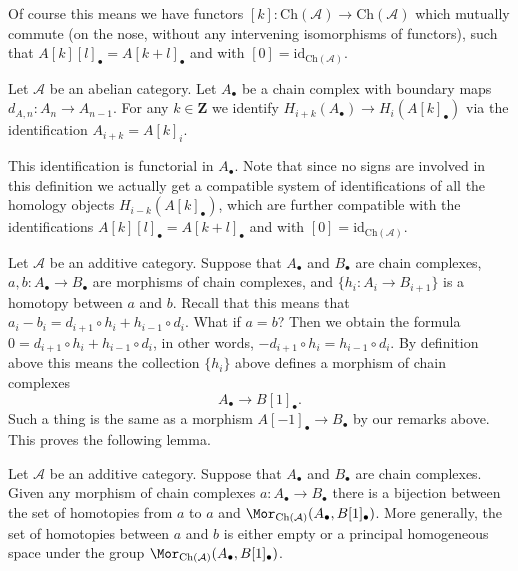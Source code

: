 \noindent
Of course this means we have functors
$[k] : \text{Ch}(\mathcal{A}) \to \text{Ch}(\mathcal{A})$
which mutually commute (on the nose, without
any intervening isomorphisms of functors),
such that $A[k][l]_\bullet = A[k + l]_\bullet$ and
with $[0] = \text{id}_{\text{Ch}(\mathcal{A})}$.

\begin{definition}
\label{definition-homology-shift}
Let $\mathcal{A}$ be an abelian category.
Let $A_\bullet$ be a chain complex
with boundary maps $d_{A, n} : A_n \to A_{n - 1}$.
For any $k \in \mathbf{Z}$ we identify
{\it $H_{i + k}(A_\bullet) \rightarrow H_i(A[k]_\bullet)$}
via the identification
$A_{i + k} = A[k]_i$.
\end{definition}

\noindent
This identification is functorial in $A_\bullet$.
Note that since no signs are involved in this
definition we actually get a compatible system
of identifications of all the homology
objects $H_{i - k}(A[k]_\bullet)$, which are
further compatible with the identifications
$A[k][l]_\bullet = A[k + l]_\bullet$ and
with $[0] = \text{id}_{\text{Ch}(\mathcal{A})}$.

\medskip\noindent
Let $\mathcal{A}$ be an additive category.
Suppose that $A_\bullet$ and $B_\bullet$ are
chain complexes, $a, b : A_\bullet \to B_\bullet$ are
morphisms of chain complexes, and $\{h_i : A_i \to B_{i + 1}\}$
is a homotopy between $a$ and $b$. Recall that this means
that
$a_i - b_i = d_{i + 1} \circ h_i + h_{i - 1} \circ d_i$.
What if $a = b$? Then we obtain the formula
$0 = d_{i + 1} \circ h_i + h_{i - 1} \circ d_i$,
in other words, $ - d_{i + 1} \circ h_i = h_{i - 1} \circ d_i$.
By definition above this means the collection $\{h_i\}$
above defines a morphism of chain complexes
$$
A_\bullet \longrightarrow B[1]_\bullet.
$$
Such a thing is the same as a morphism $A[-1]_\bullet \to B_\bullet$
by our remarks above. This proves the following lemma.

\begin{lemma}
\label{lemma-homotopy-shift}
Let $\mathcal{A}$ be an additive category.
Suppose that $A_\bullet$ and $B_\bullet$ are
chain complexes. Given any morphism of chain
complexes $a : A_\bullet \to B_\bullet$ there
is a bijection between the set of homotopies
from $a$ to $a$ and
$\Mor_{\text{Ch}(\mathcal{A})}(A_\bullet, B[1]_\bullet)$.
More generally, the set of homotopies between
$a$ and $b$ is either empty or a principal homogeneous
space under the group
$\Mor_{\text{Ch}(\mathcal{A})}(A_\bullet, B[1]_\bullet)$.
\end{lemma}

